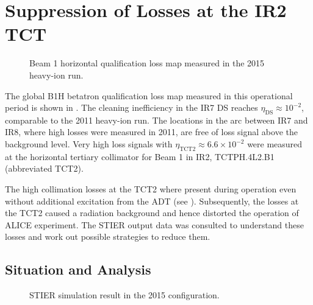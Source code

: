 \section{Suppression of Losses at the IR2 TCT}\label{chap:ir2loss}

\begin{figure}[bthp]  
    \centering
      \caption{Beam 1 horizontal qualification loss map measured in the 2015 heavy-ion run.}  
    \label{fig:2015_lossmap}
\end{figure}

The global B1H betatron qualification loss map measured in this operational period is shown in . The cleaning inefficiency in the IR7 DS reaches $\eta_\text{DS} \approx 10^{-2}$, comparable to the 2011 heavy-ion run. The locations in the arc between IR7 and IR8, where high losses were measured in 2011, are free of loss signal above the background level. Very high loss signals with $\eta_\text{TCT2} \approx 6.6 \times 10^{-2}$ were measured at the horizontal tertiary collimator for Beam 1 in IR2, TCTPH.4L2.B1 (abbreviated TCT2). 

The high collimation losses at the TCT2 where present during operation even without additional excitation from the ADT (see ). Subsequently, the losses at the TCT2 caused a radiation background and hence distorted the operation of ALICE experiment. The STIER output data was consulted to understand these losses and work out possible strategies to reduce them.


\subsection{Situation and Analysis}

\begin{figure}[b]
  \centering
  \caption{STIER simulation result in the 2015 configuration.}  
  \label{pic:16062901}
\end{figure}

